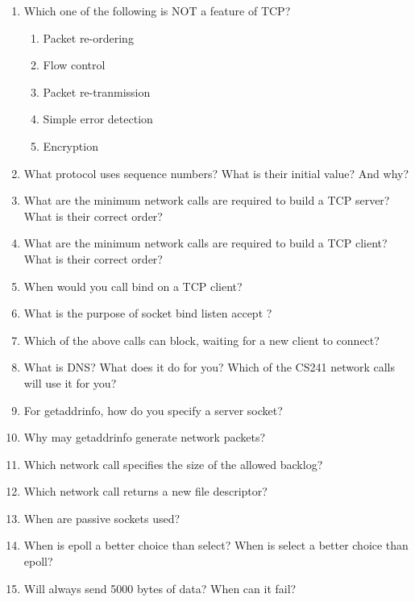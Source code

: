 \begin{enumerate}
\item Which one of the following is NOT a feature of TCP?
  \begin{enumerate}
  \item Packet re-ordering
  \item Flow control
  \item Packet re-tranmission
  \item Simple error detection
  \item Encryption
  \end{enumerate}

\item What protocol uses sequence numbers? What is their initial value? And why?

\item What are the minimum network calls are required to build a TCP server? What is their correct order?

\item What are the minimum network calls are required to build a TCP client? What is their correct order?

\item When would you call bind on a TCP client?

\item What is the purpose of socket bind listen accept ?

\item Which of the above calls can block, waiting for a new client to connect?

\item What is DNS? What does it do for you? Which of the CS241 network calls will use it for you?

\item For getaddrinfo, how do you specify a server socket?

\item Why may getaddrinfo generate network packets?

\item Which network call specifies the size of the allowed backlog?

\item Which network call returns a new file descriptor?

\item When are passive sockets used?

\item When is epoll a better choice than select? When is select a better choice than epoll?

\item Will  always send 5000 bytes of data? When can it fail?


\end{enumerate}
